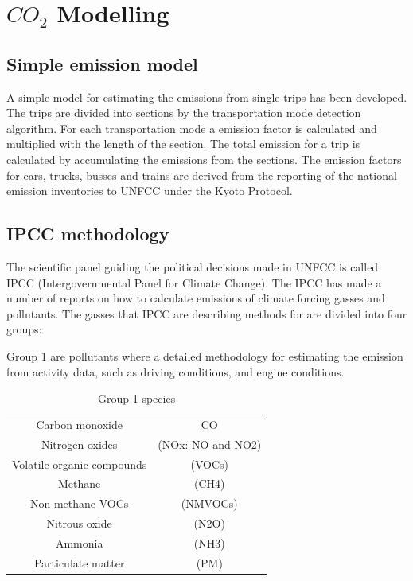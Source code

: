\section{$CO_2$ Modelling}
\subsection{Simple emission model}
\label{Modelling}
A simple model for estimating the emissions from single trips has been developed. The trips are divided into sections by the transportation mode detection algorithm. For each transportation mode a emission factor is calculated and multiplied with the length of the section. The total emission for a trip is calculated by accumulating the emissions from the sections. The emission factors for cars, trucks, busses and trains are derived from the reporting of the national emission inventories to UNFCC under the Kyoto Protocol. 

\subsection{IPCC methodology}
The scientific panel guiding the political decisions made in UNFCC is called IPCC (Intergovernmental Panel for Climate Change). The IPCC has made a number of reports on how to calculate emissions of climate forcing gasses and pollutants. The gasses that IPCC are describing methods for are divided into four groups: 

Group 1 are pollutants where a detailed methodology for estimating the emission from activity data, such as driving conditions, and engine conditions.
\begin{table}[htbp]
  \centering
  \begin{tabular}{@{} | c|c |@{}}
\hline
    Carbon monoxide & CO\\ 
Nitrogen oxides & (NOx: NO and NO2)\\
Volatile organic compounds &(VOCs)\\
Methane &(CH4)\\
Non-methane VOCs &(NMVOCs)\\
Nitrous oxide &(N2O)\\
Ammonia &(NH3)\\
Particulate matter &(PM)\\
\hline
  \end{tabular}
  \caption{Group 1 species}
  \label{tab:group1}
\end{table}


